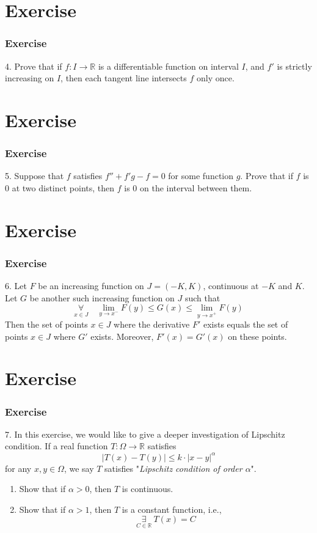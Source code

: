 \documentclass[12pt, t]{beamer}
\renewcommand{\emph}[1]{{\color{Turquoise3}\textsl{#1}}}
\begin{document}
\section{Exercise}
\begin{frame}
    \frametitle{Exercise}
4. Prove that if $f:I\rightarrow\mathbb{R}$ is a differentiable function on interval $I$, and $f'$ is strictly increasing on $I$, 
then each tangent line intersects $f$ only once.
    
\end{frame}

\section{Exercise}
\begin{frame}
    \frametitle{Exercise}
5. Suppose that $f$ satisfies $f''+f'g-f=0$ for some function $g$. Prove that if $f$ is 0 at two distinct points, 
then $f$ is 0 on the interval between them.
    
\end{frame}

\section{Exercise}
\begin{frame}
    \frametitle{Exercise}
6. Let $F$ be an increasing function on $J=(-K,K)$, continuous at $-K$ and $K$. Let $G$ be another such increasing function on $J$ such that 
\begin{equation*}
    \underset{x\in J}{\forall}\quad \underset{y\rightarrow x^-}{\lim}F(y)\leq G(x) \leq \underset{y\rightarrow x^+}{\lim}F(y)
\end{equation*}
Then the set of points $x\in J$ where the derivative $F'$ exists equals the set of points $x\in J$ where $G'$ exists. Moreover, 
$F'(x)=G'(x)$ on these points.


\end{frame}


\section{Exercise}
\begin{frame}
    \frametitle{Exercise}
7. In this  exercise, we would like to give a deeper investigation of Lipschitz condition. If a real function $T:\Omega\rightarrow\mathbb{R}$ 
satisfies
\begin{equation*}
    |T(x)-T(y)|\leq k\cdot |x-y|^\alpha
\end{equation*}
for any $x,y\in \Omega$, we say $T$ satisfies "\emph{Lipschitz condition of order $\alpha$}".
\begin{enumerate}
    \item Show that if $\alpha>0$, then $T$ is continuous.
    \item Show that if $\alpha>1$, then $T$ is a constant function, i.e.,
    \begin{equation*}
        \underset{C\in \mathbb{R}}{\exists}\ T(x)=C
    \end{equation*}
\end{enumerate}
    
\end{frame}
\end{document}
